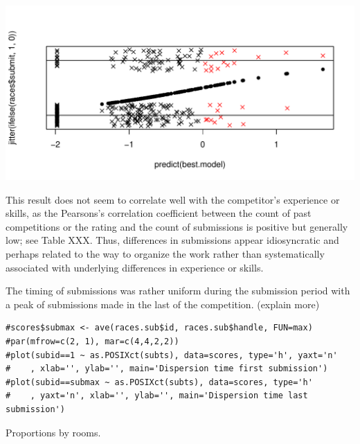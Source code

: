\documentclass[12pt,]{article}
\begin{document}
\includegraphics{Figures/unnamed-chunk-18-1.pdf}

This result does not seem to correlate well with the competitor's
experience or skills, as the Pearsons's correlation coefficient between
the count of past competitions or the rating and the count of
submissions is positive but generally low; see Table XXX. Thus,
differences in submissions appear idiosyncratic and perhaps related to
the way to organize the work rather than systematically associated with
underlying differences in experience or skills.

The timing of submissions was rather uniform during the submission
period with a peak of submissions made in the last of the competition.
(explain more)

\begin{verbatim}
#scores$submax <- ave(races.sub$id, races.sub$handle, FUN=max)
#par(mfrow=c(2, 1), mar=c(4,4,2,2))
#plot(subid==1 ~ as.POSIXct(subts), data=scores, type='h', yaxt='n'
#    , xlab='', ylab='', main='Dispersion time first submission')
#plot(subid==submax ~ as.POSIXct(subts), data=scores, type='h'
#    , yaxt='n', xlab='', ylab='', main='Dispersion time last submission')
\end{verbatim}

Proportions by rooms.
\end{document}
